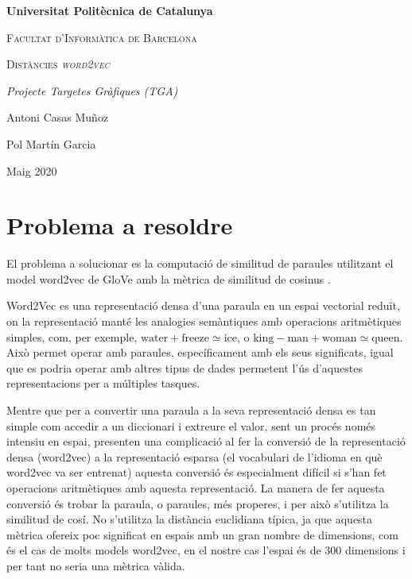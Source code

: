 \documentclass[catalan,10pt,a4paper]{article}
\begin{document}
	\begin{titlepage}
		\centering
		{\bfseries\LARGE Universitat Politècnica de Catalunya \par}
		\vspace{1cm}
		{\scshape\Large Facultat d'Informàtica de Barcelona\par}
		\vspace{3cm}
		{\scshape\Huge Distàncies \textit{word2vec} \par}
		\vspace{3cm}
		{\itshape\Large Projecte Targetes Gràfiques (TGA) \par}
		\vfill
		{\Large Antoni Casas Muñoz \par}
		{\Large Pol Martín Garcia \par}
		\vfill
		{\Large Maig 2020 \par}
	\end{titlepage}
	
	\newpage
	
\section*{Problema a resoldre}

El problema a solucionar es la computació de similitud de paraules utilitzant el model word2vec de GloVe \cite{GloVeGlo18:online} amb la mètrica de similitud de cosinus \cite{Cosinesi72:online}.

Word2Vec es una representació densa d'una paraula en un espai vectorial reduït, on la representació manté les analogies semàntiques amb operacions aritmètiques simples, com, per exemple, $\text{water} + \text{freeze} \simeq \text{ice}$, o $\text{king} - \text{man} + \text{woman} \simeq \text{queen}$. Això permet operar amb paraules, específicament amb els seus significats, igual que es podria operar amb altres tipus de dades permetent l'ús d'aquestes representacions per a múltiples tasques.

Mentre que per a convertir una paraula a la seva representació densa es tan simple com accedir a un diccionari i extreure el valor, sent un procés només intensiu en espai, presenten una complicació al fer la conversió de la representació densa (word2vec) a la representació esparsa (el vocabulari de l'idioma en què word2vec va ser entrenat) aquesta conversió és especialment difícil si s'han fet operacions aritmètiques amb aquesta representació. La manera de fer aquesta conversió és trobar la paraula, o paraules, més properes, i per això s'utilitza la similitud de cosí. No s'utilitza la distància euclidiana típica, ja que aquesta mètrica ofereix poc significat en espais amb un gran nombre de dimensions, com és el cas de molts models word2vec, en el nostre cas l'espai és de 300 dimensions i per tant no seria una mètrica vàlida.
\end{document}
